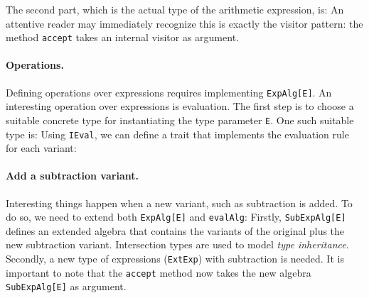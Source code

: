The second part, which is the actual type of the arithmetic expression, is:
An attentive reader may immediately recognize this is exactly the visitor
pattern: the method \lstinline{accept} takes an internal visitor as argument.



\paragraph{Operations.} Defining operations over expressions requires
implementing \lstinline{ExpAlg[E]}. An interesting operation over expressions is
evaluation. The first step is to choose a suitable concrete type for
instantiating the type parameter \lstinline{E}. One such suitable type is:
Using \lstinline{IEval}, we can define a trait that implements the evaluation
rule for each variant:


\paragraph{Add a subtraction variant.} Interesting things happen when a new
variant, such as subtraction is added. To do so, we need to extend both
\lstinline{ExpAlg[E]} and \lstinline{evalAlg}:
Firstly, \lstinline{SubExpAlg[E]} defines an extended algebra that contains the
variants of the original plus the new subtraction variant. Intersection types
are used to model \textit{type inheritance}. Secondly, a new type of expressions
(\lstinline{ExtExp}) with subtraction is needed. It is important to note that
the \lstinline{accept} method now takes the new algebra \lstinline{SubExpAlg[E]}
as argument.

